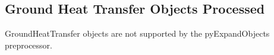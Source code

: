 \subsection{Ground Heat Transfer Objects Processed}\label{ground-heat-transfer-objects-processed}

GroundHeatTransfer objects are not supported by the pyExpandObjects preprocessor.